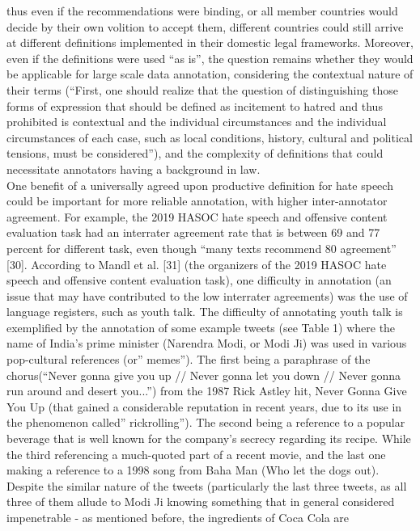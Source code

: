 \documentclass{letter}
\begin{document}
\begin{multicols}{2}
thus even if the recommendations were binding, or all 
member countries would decide by their own volition 
to accept them, different countries could still arrive at
different definitions implemented in their domestic 
legal frameworks. Moreover, even if the definitions 
were used “as is”, the question remains whether they 
would be applicable for large scale data annotation, 
considering the contextual nature of their terms (“First, 
one should realize that the question of distinguishing 
those forms of expression that should be defined as 
incitement to hatred and thus prohibited is contextual 
and the individual circumstances and the individual 
circumstances of each case, such as local conditions, 
history, cultural and political tensions, must be 
considered”), and the complexity of definitions that 
could necessitate annotators having a background in 
law.\\
One benefit of a universally agreed upon productive 
definition for hate speech could be important for more 
reliable annotation, with higher inter-annotator 
agreement. For example, the 2019 HASOC hate speech 
and offensive content evaluation task had an interrater 
agreement rate that is between 69 and 77 percent for 
different task, even though “many texts recommend 
80%
agreement” [30]. According to Mandl et al. [31] (the 
organizers of the 2019 HASOC hate speech and 
offensive content evaluation task), one difficulty in 
annotation (an issue that may have contributed to the 
low interrater agreements) was the use of language 
registers, such as youth talk. The difficulty of annotating 
youth talk is exemplified by the annotation of some 
example tweets (see Table 1) where the name of India’s 
prime minister (Narendra Modi, or Modi Ji) was used in 
various pop-cultural references (or” memes”). The first 
being a paraphrase of the chorus(“Never gonna give you 
up // Never gonna let you down // Never gonna run around 
and desert you...”) from the 1987 Rick Astley hit, Never 
Gonna Give You Up (that gained a considerable 
reputation in recent years, due to its use in the 
phenomenon called” rickrolling”). The second being a 
reference to a popular beverage that is well known for 
the company’s secrecy regarding its recipe. While the 
third referencing a much-quoted part of a recent movie, 
and the last one making a reference to a 1998 song from 
Baha Man (Who let the dogs out). Despite the similar 
nature of the tweets (particularly the last three tweets, 
as all three of them allude to Modi Ji knowing 
something that in general considered impenetrable - as 
mentioned before, the ingredients of Coca Cola are
\end{multicols}
\end{document}
